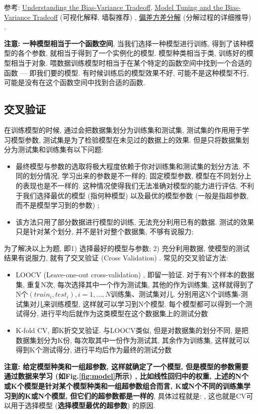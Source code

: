 参考: \href{http://scott.fortmann-roe.com/docs/BiasVariance.html}{Understanding the Bias-Variance Tradeoff}, \href{http://www.r2d3.us/visual-intro-to-machine-learning-part-2/}{Model Tuning and
	the Bias-Variance Tradeoff} (可视化解释, 墙裂推荐) , \href{https://www.cnblogs.com/makefile/p/bias-var.html}{偏差方差分解} (分解过程的详细推导) . 


\textbf{注意: }\textbf{一种模型相当于一个函数空间}, 当我们选择一种模型进行训练, 得到了该种模型的各个参数, 就相当于得到了一个实例化的模型. 模型种类相当于类, 训练好的模型相当于对象. 喂数据训练模型时相当于在某个特定的函数空间中找到一个合适的函数 --- 即我们要的模型. 有时候训练后的模型效果不好, 可能不是这种模型不行, 可能是没有在这个函数空间中找到合适的函数. 

\subsection{交叉验证}
在训练模型的时候, 通过会把数据集划分为训练集和测试集, 测试集的作用用于学习模型参数, 测试集是为了检验模型在未见过的数据上的效果. 但是只将数据集划分为测试集和训练集有以下问题: 
\begin{itemize}
	\item 最终模型与参数的选取将极大程度依赖于你对训练集和测试集的划分方法. 不同的划分情况, 学习出来的参数是不一样的; 固定模型参数, 模型在不同划分上的表现也是不一样的. 这种情况使得我们无法准确对模型的能力进行评估, 不利于我们选择最优的模型 (指何种模型) 以及最优的模型参数 (一般是指超参数, 而不是模型学习到的参数) ; 
	\item 该方法只用了部分数据进行模型的训练, 无法充分利用已有的数据. 测试的效果只是针对某个划分, 并不是针对整个数据集, 不够有说服力; 
\end{itemize}
为了解决以上为题, 即1) 选择最好的模型与参数; 2) 充分利用数据, 使模型的测试结果有说服力, 就有了交叉验证 (Cross Validation) . 常见的交叉验证方法: 
\begin{itemize}
	\item LOOCV (Leave-one-out cross-validation) , 即留一验证. 对于有N个样本的数据集, 重复N次, 每次选择其中一个作为测试集, 其他的作为训练集, 这样就得到了N个$(train_i, test_i), i = 1, ..., N$训练集、测试集对儿. 分别用这N个训练集-测试集对儿来训练模型, 这样就可以学习到N个模型. 每个模型都可以得到一个测试得分, 进行平均后就作为这类模型在这个数据集上的测试分数
	
	\item K-fold CV, 即K折交叉验证. 与LOOCV类似, 但是对数据集的划分不同, 是把数据集划分为K份, 每次取其中一份作为测试其, 其余作为训练集, 这样就可以得到K个测试得分, 进行平均后作为最终的测试分数
\end{itemize}
\textbf{注意: 给定模型种类和一组超参数, 这样就确定了一个模型, 但是模型的参数需要通过数据来学习 (如Fig.\ref{fig:model}所示) , 比如线性回归中的权重, 上述的N个或K个模型是针对某个模型种类和一组超参数组合而言, K或N个不同的训练集学习到的K或N个模型, 但它们的超参数都是一样的}, 具体过程就是: , 这也就是CV可以用于选择模型 (\textbf{选择模型最优的超参数}) 的原因. 

